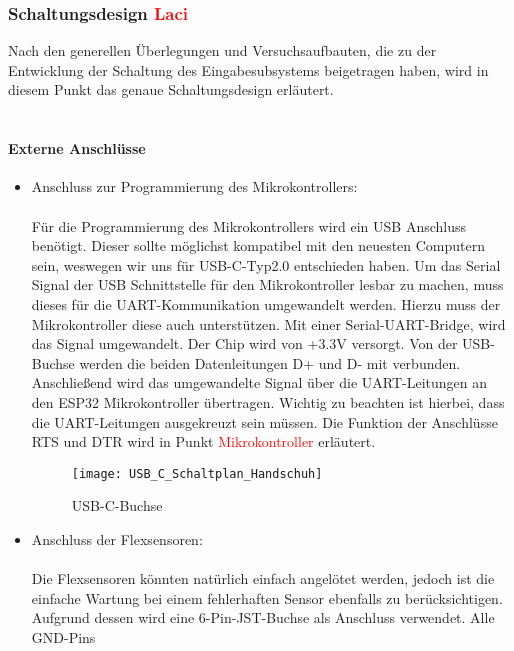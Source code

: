 \documentclass[titlepage,12pt,twoside]{article}
\begin{document}
\subsubsection{Schaltungsdesign \textcolor{red}{Laci}}
Nach den generellen Überlegungen und Versuchsaufbauten, die zu der Entwicklung der Schaltung des Eingabesubsystems beigetragen haben, wird in diesem Punkt 
das genaue Schaltungsdesign erläutert. \\
\\
\paragraph{Externe Anschlüsse}
\hfill \break
\hfill \break
\begin{itemize}
	\item Anschluss zur Programmierung des Mikrokontrollers: \\
		  \\
		  Für die Programmierung des Mikrokontrollers wird ein USB Anschluss benötigt. Dieser sollte möglichst kompatibel mit
		  den neuesten Computern sein, weswegen wir uns für USB-C-Typ2.0 entschieden haben. Um das Serial Signal der USB Schnittstelle
		  für den Mikrokontroller lesbar zu machen, muss dieses für die UART-Kommunikation umgewandelt werden. Hierzu muss der Mikrokontroller
		  diese auch unterstützen. Mit einer Serial-UART-Bridge, wird das Signal umgewandelt. Der Chip wird von +3.3V versorgt.
		  Von der USB-Buchse werden die beiden Datenleitungen D+ und D- mit verbunden. Anschließend wird das umgewandelte Signal 
		  über die UART-Leitungen an den ESP32 Mikrokontroller übertragen. Wichtig zu beachten ist hierbei, dass die UART-Leitungen
		  ausgekreuzt sein müssen. Die Funktion der Anschlüsse RTS und DTR wird in Punkt \textcolor{red}{Mikrokontroller} erläutert. \\
		  \begin{figure}[H]
			\begin{center}
				\scalebox{0.5}
				{\texttt{[image: USB\_C\_Schaltplan\_Handschuh]}}
				\caption{USB-C-Buchse}
				\label{fig:USB_C_Schaltplan_Handschuh}				
			\end{center}
		\end{figure}
	\item Anschluss der Flexsensoren: \\
		  \\
		  Die Flexsensoren könnten natürlich einfach angelötet werden, jedoch ist die einfache Wartung bei einem fehlerhaften
		  Sensor ebenfalls zu berücksichtigen. Aufgrund dessen wird eine 6-Pin-JST-Buchse als Anschluss verwendet. Alle GND-Pins

\end{itemize}
\end{document}
